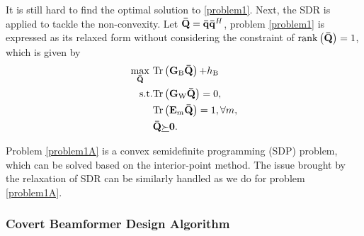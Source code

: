 \documentclass[10pt,journal,letterpaper,twocolumn,twoside]{IEEEtran} %
\begin{document}
 It is still hard to find the optimal solution to  \eqref{problem1}. Next, the SDR is applied
to tackle the non-convexity. Let ${\bf{\bar Q}} = {\bf{\bar q}}{{{\bf{\bar q}}}^H}$, problem \eqref{problem1} is expressed as  its relaxed form without considering
the constraint of ${\rm{rank}}\left( {{\bf{{\bar Q}}}} \right) = 1$, which is given by
    \begin{subequations}\label{problem1A}
\begin{align}
\mathop {\max }\limits_{{\bf{\bar Q}}} ~&  {{\rm{Tr}}\left( {{{\bf{G}}_{\rm{B}}}{\bf{\bar Q}}} \right){\rm{ + }}{h_{\rm{B}}}} \\
{\rm{s}}.{\rm{t}}.&{\rm{Tr}}\left( {{{\bf{G}}_{\rm{W}}}{\bf{\bar Q}}} \right) = 0,\\
&{\rm{Tr}}\left( {{{\bf{E}}_m}{\bf{\bar Q}}} \right) = 1,\forall m,\\
&{\bf{\bar Q}}\underline  \succ  {\bf{0}}.
 \end{align}
\end{subequations}

Problem \eqref{problem1A} is a convex semidefinite programming (SDP) problem, which can be solved based on the interior-point method.
The issue brought by the relaxation of SDR can be similarly handled as we do for problem \eqref{problem1A}.






\subsubsection{{Covert Beamformer Design Algorithm}}
\end{document}

